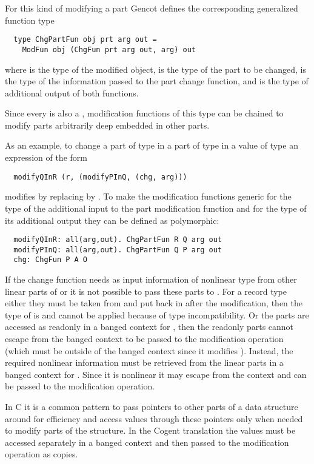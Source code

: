 For this kind of modifying a part Gencot defines the corresponding generalized function type
\begin{verbatim}
  type ChgPartFun obj prt arg out = 
    ModFun obj (ChgFun prt arg out, arg) out
\end{verbatim}
where  is the type of the modified object,  is the type of the part to be changed,  is the type
of the information passed to the part change function, and  is the type of additional output of both functions.

Since every  is also a , modification functions of this type can be chained to modify parts arbitrarily 
deep embedded in other parts. 

As an example, to change a part  of type  in a part  of type  in a value  of type 
an expression of the form
\begin{verbatim}
  modifyQInR (r, (modifyPInQ, (chg, arg)))
\end{verbatim}
modifies  by replacing  by . To make the modification functions generic for the type of the additional input
to the part modification function and for the type of its additional output they can be defined as polymorphic:
\begin{verbatim}
  modifyQInR: all(arg,out). ChgPartFun R Q arg out
  modifyPInQ: all(arg,out). ChgPartFun Q P arg out
  chg: ChgFun P A O
\end{verbatim}

If the change function  needs as input information of nonlinear type from other linear parts of  or  it is not
possible to pass these parts to . For a record type  either they must be taken from  and put back in after the modification, then
the type of  is  and  cannot be applied because of type incompatibility. Or the parts are
accessed as readonly in a banged context for , then the readonly parts cannot escape from the banged context to be passed to the
modification operation (which must be outside of the banged context since it modifies ). Instead, the required nonlinear information must 
be retrieved from the linear parts in a banged context for . Since it is nonlinear it may escape from the context and can be passed 
to the modification operation.

In C it is a common pattern to pass pointers to other parts of a data structure around for efficiency and access values through these pointers 
only when needed to modify parts of the structure. In the Cogent translation the values must be accessed separately in a banged context and then
passed to the modification operation as copies.

